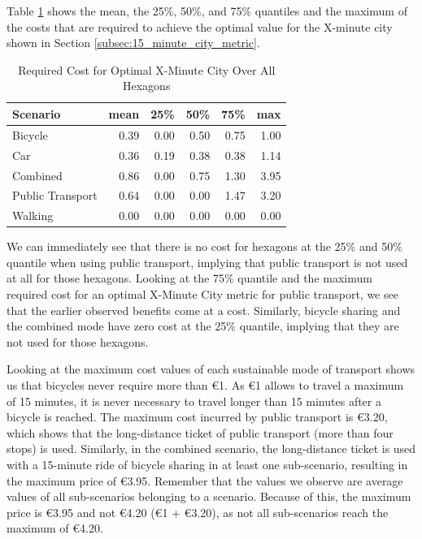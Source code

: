Table \ref{tab:required_cost} shows the mean, the 25\%, 50\%, and 75\% quantiles and the maximum of the costs that are required to achieve the optimal value for the X-minute city shown in Section \ref{subsec:15_minute_city_metric}.
\begin{table}
  \caption{Required Cost for Optimal X-Minute City Over All Hexagons}
  \label{tab:required_cost}
  \begin{center}
    \begin{tabular}{|l|r|r|r|r|r|}
    \hline
    Scenario & mean & 25\% & 50\% & 75\% & max \\
    \hline
    Bicycle & 0.39 & 0.00 & 0.50 & 0.75 & 1.00 \\
    \hline
    Car & 0.36 & 0.19 & 0.38 & 0.38 & 1.14 \\
    \hline
    Combined & 0.86 & 0.00 & 0.75 & 1.30 & 3.95 \\
    \hline
    Public Transport & 0.64 & 0.00 & 0.00 & 1.47 & 3.20 \\
    \hline
    Walking & 0.00 & 0.00 & 0.00 & 0.00 & 0.00 \\
    \hline
    \end{tabular}
  \end{center}
\end{table}
We can immediately see that there is no cost for hexagons at the 25\% and 50\% quantile when using public transport, implying that public transport is not used at all for those hexagons.
Looking at the 75\% quantile and the maximum required cost for an optimal X-Minute City metric for public transport, we see that the earlier observed benefits come at a cost.
Similarly, bicycle sharing and the combined mode have zero cost at the 25\% quantile, implying that they are not used for those hexagons.

Looking at the maximum cost values of each sustainable mode of transport shows us that bicycles never require more than \euro{1}.
As \euro{1} allows to travel a maximum of 15 minutes, it is never necessary to travel longer than 15 minutes after a bicycle is reached.
The maximum cost incurred by public transport is \euro{3.20}, which shows that the long-distance ticket of public transport (more than four stops) is used.
Similarly, in the combined scenario, the long-distance ticket is used with a 15-minute ride of bicycle sharing in at least one sub-scenario, resulting in the maximum price of \euro{3.95}.
Remember that the values we observe are average values of all sub-scenarios belonging to a scenario.
Because of this, the maximum price is \euro{3.95} and not \euro{4.20} (\euro{1} + \euro{3.20}), as not all sub-scenarios reach the maximum of \euro{4.20}.

